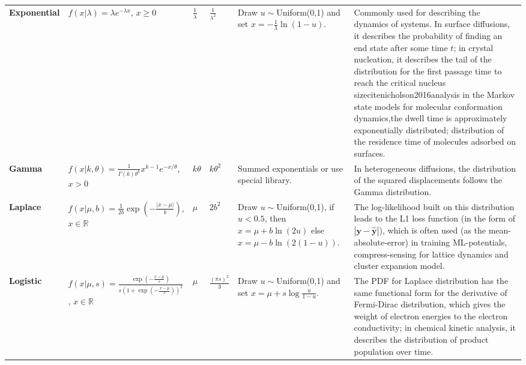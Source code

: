 \begin{longtable}{p{2cm}
    >{\raggedright\arraybackslash}p{3.5cm}
    >{\raggedright\arraybackslash}p{1.0cm}
    >{\raggedright\arraybackslash}p{2cm}
    >{\raggedright\arraybackslash}p{2.5cm}
    p{6cm}}
\footnotesize{\textbf{Exponential}} 
& \footnotesize{$f(x|\lambda)=\lambda e^{-\lambda x}$, $x\geq 0$}
& \footnotesize{$\frac{1}{\lambda}$}
& \footnotesize{$\frac{1}{\lambda^2}$}
& \footnotesize{Draw $u\sim$Uniform(0,1) and set $x=-\frac{1}{\lambda}\ln(1-u)$.}
& \footnotesize{Commonly used for describing the dynamics of systems. In surface diffusions, it describes the probability of finding an end state after some time $t$;\cite{andersen2019practical} in crystal nucleation, it describes the tail of the distribution for the first passage time to reach the critical nucleus size\;cite{nicholson2016analysis} in the Markov state models for molecular conformation dynamics,the dwell time is approximately exponentially distributed;\cite{chodera2014markov} distribution of the residence time of molecules adsorbed on surfaces.\cite{turchi2025segmentation}}\\

\footnotesize{\textbf{Gamma}} 
& \footnotesize{$f(x|k,\theta)=\frac{1}{\Gamma(k)\theta^k}x^{k-1}e^{-x/\theta}$, $x>0$}
& \footnotesize{$k\theta$}
& \footnotesize{$k\theta^2$}
& \footnotesize{Summed exponentials or use special library.}
& \footnotesize{In heterogeneous diffusions, the distribution of the squared displacements follows the Gamma distribution.\cite{matsuda2018estimation}}\\

\footnotesize{\textbf{Laplace}} 
& \footnotesize{$f(x|\mu,b)=\frac{1}{2b}\exp\left(-\frac{|x-\mu|}{b}\right)$, $x\in\mathbb{R}$}
& \footnotesize{$\mu$}
& \footnotesize{$2b^2$}
& \footnotesize{Draw $u\sim$Uniform(0,1), if $u<0.5$, then $x=\mu+b\ln (2u)$ else $x=\mu-b\ln(2(1-u))$.}
& \footnotesize{The log-likelihood built on this distribution leads to the L1 loss function (in the form of $|\bm{y}-\hat{\bm{y}}|$), which is often used (as the mean-absolute-error) in training ML-potentials,\cite{morrow2023validate} compress-sensing for lattice dynamics\cite{zhou2019compressive} and cluster expansion model.\cite{nelson2013compressive}}\\

\footnotesize{\textbf{Logistic}} 
& \footnotesize{$f(x|\mu,s)=\frac{\exp\left(-\frac{x-\mu}{s}\right)}{s\left(1+\exp\left(-\frac{x-\mu}{s}\right)\right)^2}$, $x\in\mathbb{R}$}
& \footnotesize{$\mu$}
& \footnotesize{$\frac{(\pi s)^2}{3}$}
& \footnotesize{Draw $u\sim$Uniform(0,1) and set $x=\mu+s\log\frac{u}{1-u}$.}
& \footnotesize{The PDF for Laplace distribution has the same functional form for the derivative of Fermi-Dirac distribution, which gives the weight of electron energies to the electron conductivity;\cite{madsen2006boltztrap} in chemical kinetic analysis, it describes the distribution of product population over time.\cite{burnham2017use}}\\


\end{longtable}
